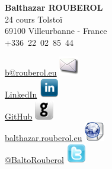 


\pagestyle{empty}

\begin{minipage}{0.6\textwidth}
\raggedright
{
        \textbf{\huge Balthazar ROUBEROL}\\
        \medskip
        {\scriptsize 24 cours Tolstoï \\
        69100 Villeurbanne - France \\
        +336~22~02~85~44 \\
        }
}
\end{minipage}
\begin{minipage}{0.395\textwidth}
\raggedleft
{	
		{\scriptsize
		\href{mailto:b@rouberol.eu}{b@rouberol.eu} \includegraphics[scale=0.3]{IMG/email.png}\\
		\href{http://www.linkedin.com/profile/view?id=148957121\&locale=en\_US\&trk=tab\_pro}{LinkedIn} \includegraphics[scale=0.3]{IMG/linkedin.png}\\
		\href{https://github.com/BaltoRouberol}{GitHub} \includegraphics[scale=0.3]{IMG/github.png}\\
		\href{http://balthazar.rouberol.eu}{balthazar.rouberol.eu} \includegraphics[scale=0.3]{IMG/webpage.png}\\
        \href{https://twitter.com/BaltoRouberol}{@BaltoRouberol} \includegraphics[scale=0.3]{IMG/twitter.png}\\
        
        }
}
\end{minipage}

